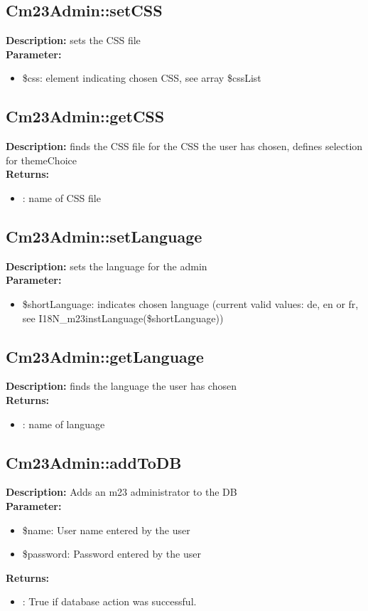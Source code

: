 \subsection{Cm23Admin::setCSS}
\textbf{Description:} sets the CSS file\\
\textbf{Parameter:}
\begin{itemize}
\item \$css: element indicating chosen CSS, see array \$cssList
\end{itemize}

\subsection{Cm23Admin::getCSS}
\textbf{Description:} finds the CSS file for the CSS the user has chosen, defines selection for themeChoice\\
\textbf{Returns:}
\begin{itemize}
\item : name of CSS file
\end{itemize}

\subsection{Cm23Admin::setLanguage}
\textbf{Description:} sets the language for the admin \\
\textbf{Parameter:}
\begin{itemize}
\item \$shortLanguage: indicates chosen language (current valid values: de, en or fr, see I18N\_m23instLanguage(\$shortLanguage))
\end{itemize}

\subsection{Cm23Admin::getLanguage}
\textbf{Description:} finds the language the user has chosen\\
\textbf{Returns:}
\begin{itemize}
\item : name of language
\end{itemize}

\subsection{Cm23Admin::addToDB}
\textbf{Description:} Adds an m23 administrator to the DB\\
\textbf{Parameter:}
\begin{itemize}
\item \$name: User name entered by the user
\item \$password: Password entered by the user
\end{itemize}
\textbf{Returns:}
\begin{itemize}
\item : True if database action was successful.
\end{itemize}

